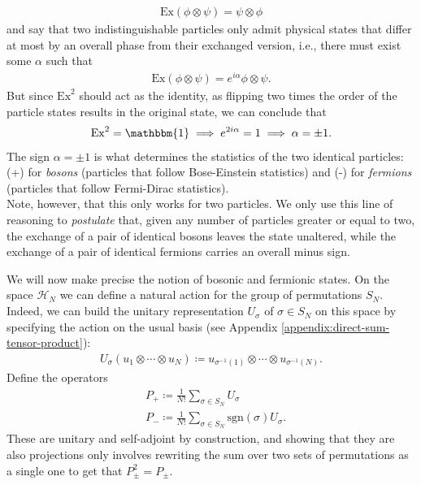 \begin{align*}
	\mathrm{Ex}(\phi\otimes\psi) = \psi\otimes\phi
\end{align*}
and say that two indistinguishable particles only admit physical states that differ at most by
an overall phase from their exchanged version, i.e., there must exist some $\alpha$ such that
\begin{align*}
	\mathrm{Ex}(\phi\otimes\psi) = e^{i\alpha}\phi\otimes\psi.
\end{align*}
But since $\mathrm{Ex}^2$ should act as the identity, as flipping two times the order of the
particle states results in the original state, we can conclude that
\begin{align*}
	\mathrm{Ex}^2 = \mathbbm{1} \implies e^{2i\alpha} = 1 \implies \alpha = \pm 1.
\end{align*}
The sign $\alpha=\pm1$ is what determines the statistics of the two identical particles:
(+) for \textit{bosons} (particles that follow Bose-Einstein statistics) and (-) for
\textit{fermions} (particles that follow Fermi-Dirac statistics).
\\
Note, however, that this only works for two particles. We only use this line of reasoning to
\textit{postulate} that, given any number of particles greater or equal to two, the exchange
of a pair of identical bosons leaves the state unaltered, while the exchange of a pair of
identical fermions carries an overall minus sign.

We will now make precise the notion of bosonic and fermionic states. On the space
$\mathcal{H}_N$ we can define a natural action for the group of permutations $S_N$. Indeed, we
can build the unitary representation $U_\sigma$ of $\sigma\in S_N$ on this space by specifying
the action on the usual basis (see Appendix \ref{appendix:direct-sum-tensor-product}):
\begin{align*}
	U_\sigma (u_1 \otimes \cdots \otimes u_N) \coloneq u_{\sigma^{-1}(1)} \otimes \cdots \otimes u_{\sigma^{-1}(N)}.
\end{align*}
Define the operators
\begin{align}
	\label{eq:projections}
	&P_+ \coloneq \frac{1}{N!} \sum_{\sigma\in S_N} U_\sigma \\
	&P_- \coloneq \frac{1}{N!} \sum_{\sigma\in S_N} \mathrm{sgn}(\sigma) U_\sigma. \nonumber
\end{align}
These are unitary and self-adjoint by construction, and showing that they are also projections
only involves rewriting the sum over two sets of permutations as a single one to get that
$P_\pm^2 = P_\pm$.

